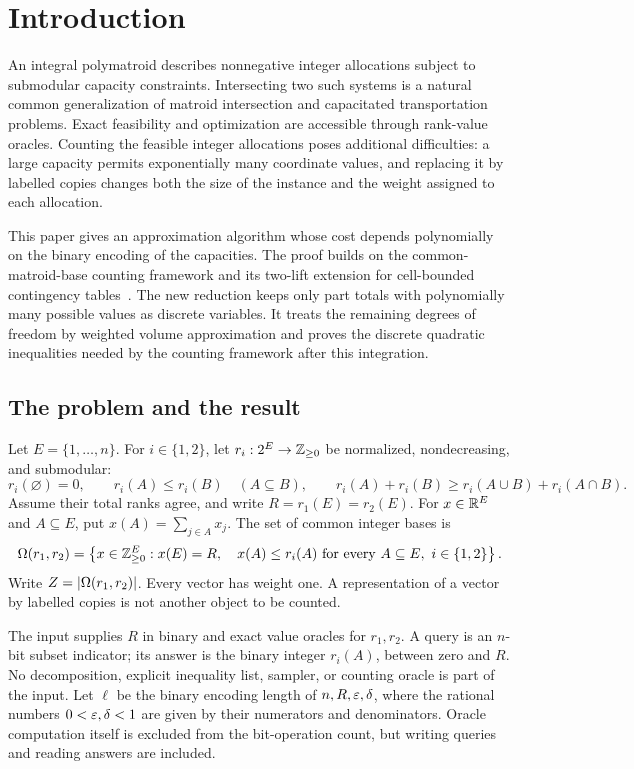 \section{Introduction}\label{sec:introduction}

An integral polymatroid describes nonnegative integer allocations subject
to submodular capacity constraints. Intersecting two such systems is a
natural common generalization of matroid intersection and capacitated
transportation problems. Exact feasibility and optimization are accessible
through rank-value oracles. Counting the feasible integer allocations
poses additional difficulties: a large capacity permits exponentially
many coordinate values, and replacing it by labelled copies changes both
the size of the instance and the weight assigned to each allocation.

This paper gives an approximation algorithm whose cost depends
polynomially on the binary encoding of the capacities. The proof builds
on the common-matroid-base counting framework and its two-lift extension
for cell-bounded contingency tables~\cite{Parent,CB}. The new reduction
keeps only part totals with polynomially many possible values as discrete variables. It treats
the remaining degrees of freedom by weighted volume approximation and
proves the discrete quadratic inequalities needed by the counting
framework after this integration.

\subsection{The problem and the result}

Let $E=\{1,\ldots,n\}$. For $i\in\{1,2\}$, let
$r_i:2^E\to\mathbb Z_{\ge0}$ be normalized, nondecreasing, and submodular:
\[
 r_i(\varnothing)=0,\qquad
 r_i(A)\le r_i(B)\quad(A\subseteq B),\qquad
 r_i(A)+r_i(B)\ge r_i(A\cup B)+r_i(A\cap B).
\]
Assume their total ranks agree, and write $R=r_1(E)=r_2(E)$.
For $x\in\mathbb R^E$ and $A\subseteq E$, put $x(A)=\sum_{j\in A}x_j$.
The set of common integer bases is
\begin{equation}\label{eq:counting-problem}
 \Omega(r_1,r_2)=
 \left\{x\in\mathbb Z_{\ge0}^E:
 x(E)=R,\quad x(A)\le r_i(A)
 \text{ for every }A\subseteq E,\ i\in\{1,2\}\right\}.
\end{equation}
Write $Z=\lvert\Omega(r_1,r_2)\rvert$. Every vector has weight one.
A representation of a vector by labelled
copies is not another object to be counted.

The input supplies $R$ in binary and exact value oracles for $r_1,r_2$.
A query is an $n$-bit subset indicator; its answer is the binary integer
$r_i(A)$, between zero and $R$. No decomposition, explicit inequality
list, sampler, or counting oracle is part of the input. Let $\ell$ be
the binary encoding length of $n,R,\varepsilon,\delta$, where the rational
numbers $0<\varepsilon,\delta<1$ are given by their numerators and denominators.
Oracle computation itself is excluded from the bit-operation count, but
writing queries and reading answers are included.

